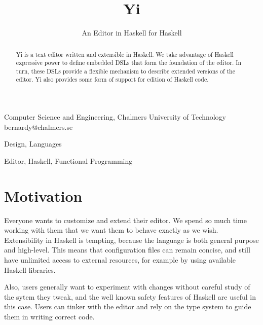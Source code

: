 \documentclass[9pt,indentedstyle,preprint]{sigplanconf}
\begin{document}
\copyrightdata{[to be supplied]} 


\title{Yi}
\subtitle{An Editor in Haskell for Haskell}

           {Computer Science and Engineering, 
            Chalmers University of Technology
          }
           {bernardy@chalmers.se}

\maketitle

\begin{abstract}
  Yi is a text editor written and extensible in Haskell. We take
  advantage of Haskell expressive power to define embedded DSLs that form the
  foundation of the editor. In turn, these DSLs provide a flexible
  mechanism to describe extended versions of the editor. Yi also
  provides some form of support for edition of Haskell code.
\end{abstract}


\terms
Design, Languages

\keywords
Editor, Haskell, Functional Programming

\section{Motivation}

Everyone wants to customize and extend their editor. We spend so much time
working with them that we want them to behave exactly as we wish.
Extensibility in Haskell is tempting, because the language is both
general purpose and high-level. This means that configuration files can remain
concise, and still have unlimited access to external resources, for
example by using available Haskell libraries.

Also, users generally want to experiment with changes without careful study of
the sytem they tweak, and the well known safety features of Haskell are useful
in this case. Users can tinker with the editor and rely on the type system to
guide them in writing correct code.
\end{document}
